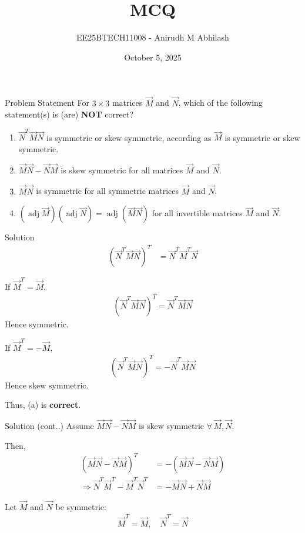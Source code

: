 \documentclass{beamer}
\title{MCQ}
\author{EE25BTECH11008 - Anirudh M Abhilash}
\date{October 5, 2025}
\begin{document}
\begin{frame}
\titlepage
\end{frame}

\begin{frame}{Problem Statement}
For $3 \times 3$ matrices $\vec{M}$ and $\vec{N}$, which of the following statement(s) is (are) \textbf{NOT} correct?  

\begin{multicols}{2}
\begin{enumerate}[label=(\alph*)]
\item $\vec{N}^T \vec{M} \vec{N}$ is symmetric or skew symmetric, according as $\vec{M}$ is symmetric or skew symmetric.
\item $\vec{M}\vec{N} - \vec{N}\vec{M}$ is skew symmetric for all matrices $\vec{M}$ and $\vec{N}$.
\item $\vec{M}\vec{N}$ is symmetric for all symmetric matrices $\vec{M}$ and $\vec{N}$.
\item $(\operatorname{adj}\vec{M})(\operatorname{adj}\vec{N}) = \operatorname{adj}(\vec{M}\vec{N})$ for all invertible matrices $\vec{M}$ and $\vec{N}$.
\end{enumerate}
\end{multicols}
\end{frame}

\begin{frame}{Solution}
\begin{align}
(\vec{N}^T \vec{M} \vec{N})^T &= \vec{N}^T \vec{M}^T \vec{N}
\end{align}

If $\vec{M}^T = \vec{M}$,  
\begin{align}
(\vec{N}^T \vec{M} \vec{N})^T = \vec{N}^T \vec{M} \vec{N}
\end{align}
Hence symmetric.

If $\vec{M}^T = -\vec{M}$,  
\begin{align}
(\vec{N}^T \vec{M} \vec{N})^T = -\vec{N}^T \vec{M} \vec{N}
\end{align}
Hence skew symmetric.  

Thus, (a) is \textbf{correct}.
\end{frame}

\begin{frame}{Solution (cont..)}
Assume $\vec{M}\vec{N} - \vec{N}\vec{M}$ is skew symmetric $\forall \, \vec{M}, \vec{N}$.

Then,
\begin{align}
(\vec{M}\vec{N} - \vec{N}\vec{M})^T &= -(\vec{M}\vec{N} - \vec{N}\vec{M}) \\
\Rightarrow \vec{N}^T \vec{M}^T - \vec{M}^T \vec{N}^T &= -\vec{M}\vec{N} + \vec{N}\vec{M}
\end{align}

Let $\vec{M}$ and $\vec{N}$ be symmetric:
\begin{align}
\vec{M}^T = \vec{M}, \quad \vec{N}^T = \vec{N}
\end{align}
\end{frame}
\end{document}
